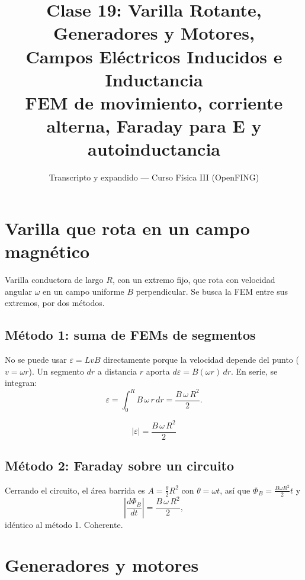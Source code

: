 \documentclass[12pt,a4paper]{article}
\title{\textbf{Clase 19: Varilla Rotante, Generadores y Motores, \\
        Campos Eléctricos Inducidos e Inductancia}\\[0.3em]
        \large{FEM de movimiento, corriente alterna, Faraday para $\mathbf{E}$
              y autoinductancia}}
\author{Transcripto y expandido --- Curso Física III (OpenFING)}
\date{}
\begin{document}
\maketitle
\thispagestyle{empty}
\newpage

\tableofcontents
\newpage

\section{Varilla que rota en un campo magnético}

Varilla conductora de largo $R$, con un extremo fijo, que rota con velocidad
angular $\omega$ en un campo uniforme $B$ perpendicular. Se busca la FEM entre
sus extremos, por dos métodos.

\subsection{Método 1: suma de FEMs de segmentos}

No se puede usar $\varepsilon = LvB$ directamente porque la velocidad depende
del punto ($v = \omega r$). Un segmento $dr$ a distancia $r$ aporta
$d\varepsilon = B(\omega r)\,dr$. En serie, se integran:
\[
\varepsilon = \int_0^{R} B\,\omega\, r\, dr = \frac{B\,\omega\,R^2}{2}.
\]

\begin{keybox}
  \[
  \boxed{|\varepsilon| = \frac{B\,\omega\,R^2}{2}}
  \]
\end{keybox}

\subsection{Método 2: Faraday sobre un circuito}

Cerrando el circuito, el área barrida es $A = \tfrac{\theta}{2}R^2$ con
$\theta = \omega t$, así que $\Phi_B = \tfrac{B\omega R^2}{2}t$ y
\[
\left|\frac{d\Phi_B}{dt}\right| = \frac{B\,\omega\,R^2}{2},
\]
idéntico al método 1. Coherente.



\section{Generadores y motores}
\end{document}
